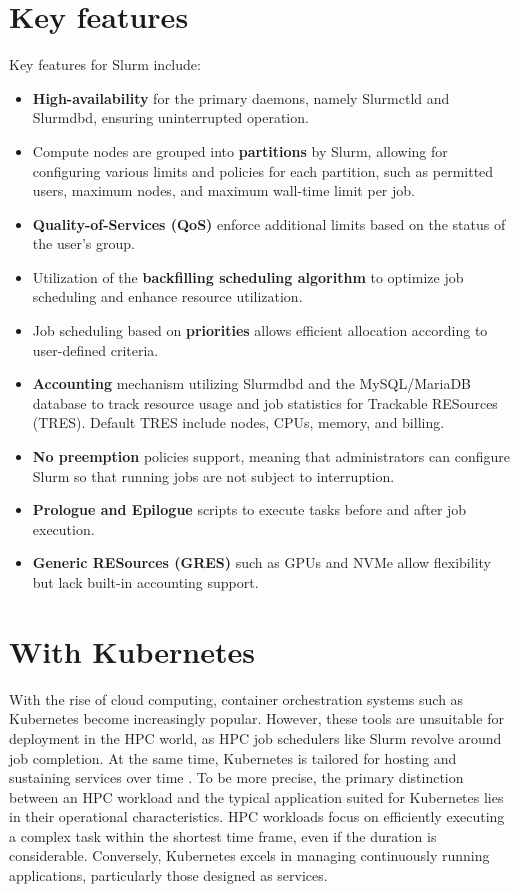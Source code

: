 \section{Key features}
Key features for Slurm include:
\begin{itemize}
    \item \textbf{High-availability} for the primary daemons, namely Slurmctld and Slurmdbd, ensuring uninterrupted operation.
    \item Compute nodes are grouped into \textbf{partitions} by Slurm, allowing for configuring various limits and policies for each partition, such as permitted users, maximum nodes, and maximum wall-time limit per job.
    \item \textbf{Quality-of-Services (QoS)} enforce additional limits based on the status of the user's group.
    \item Utilization of the \textbf{backfilling scheduling algorithm} to optimize job scheduling and enhance resource utilization.
    \item Job scheduling based on \textbf{priorities} allows efficient allocation according to user-defined criteria.
    \item \textbf{Accounting} mechanism utilizing Slurmdbd and the MySQL/MariaDB database to track resource usage and job statistics for Trackable RESources (TRES). Default TRES include nodes, CPUs, memory, and billing.
    \item \textbf{No preemption} policies support, meaning that administrators can configure Slurm so that running jobs are not subject to interruption.
    \item \textbf{Prologue and Epilogue} scripts to execute tasks before and after job execution.
    \item \textbf{Generic RESources (GRES)} such as GPUs and NVMe allow flexibility but lack built-in accounting support.
\end{itemize}

\section{With Kubernetes}

With the rise of cloud computing, container orchestration systems such as Kubernetes become increasingly popular. However, these tools are unsuitable for deployment in the HPC world, as HPC job schedulers like Slurm revolve around job completion. At the same time, Kubernetes is tailored for hosting and sustaining services over time \cite{9235080}. To be more precise, the primary distinction between an HPC workload and the typical application suited for Kubernetes lies in their operational characteristics. HPC workloads focus on efficiently executing a complex task within the shortest time frame, even if the duration is considerable. Conversely, Kubernetes excels in managing continuously running applications, particularly those designed as services.

